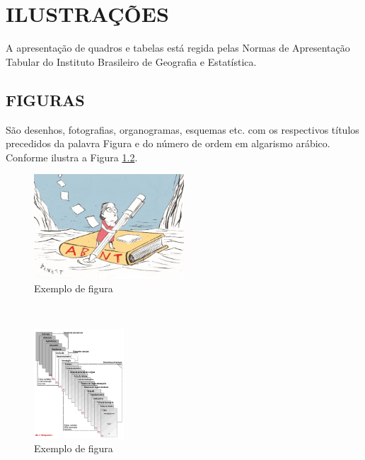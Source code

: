 %
%
\chapter{ILUSTRAÇÕES}


A apresentação de quadros e tabelas está regida pelas Normas de Apresentação Tabular do Instituto Brasileiro de Geografia e Estatística.

\section{FIGURAS}

São desenhos, fotografias, organogramas, esquemas etc. com os respectivos títulos precedidos da palavra Figura e do número de ordem em algarismo arábico. Conforme ilustra a Figura \ref{fig:abnt}.

\begin{figure}[H]
    \centering
    
	\vspace*{0,2cm}
    \includegraphics[width=0.5\textwidth]{./04-figuras/navegar_abnt}
    \caption{Exemplo de figura}
    \label{fig:ilustfig}
\end{figure}
\vspace*{-1,5cm}
{\raggedright {}}\\


\begin{figure}[H]
    \centering
    
	\vspace*{0,2cm}
    \includegraphics[width=0.3\textwidth]{./04-figuras/abnt.png}
    \caption{Exemplo de figura}
    \label{fig:abnt}
\end{figure}
\vspace*{-1,5cm}
{\raggedright {}}
\newpage

